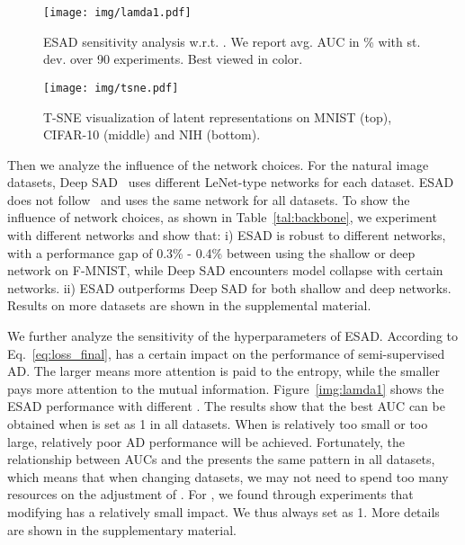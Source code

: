 \documentclass{bmvc2k}
\begin{document}
\begin{figure}[t]
\centering
\begin{minipage}[t]{0.47\textwidth}
\centering
\texttt{[image: img/lamda1.pdf]}
\vspace{-8pt}
\caption{\label{img:lamda1}ESAD sensitivity analysis w.r.t. . We report avg. AUC in \% with st. dev. over 90 experiments. Best viewed in color.}
\end{minipage}
\begin{minipage}[t]{0.2\textwidth}
\end{minipage}
\begin{minipage}[t]{0.47\textwidth}
\centering
\texttt{[image: img/tsne.pdf]}
\vspace{-5pt}
\caption{\label{img:tsne}T-SNE visualization of latent representations on MNIST (top), CIFAR-10 (middle) and NIH (bottom).}
\end{minipage}
\vspace{-5pt}
\end{figure}

Then we analyze the influence of the network choices. For the natural image datasets, Deep SAD~\cite{SAD} uses different LeNet-type networks for each dataset. ESAD does not follow~\cite{SAD} and uses the same network for all datasets. To show the influence of network choices, as shown in Table~\ref{tal:backbone}, we experiment with different networks and show that: i) ESAD is robust to different networks, with a performance gap of 0.3\% - 0.4\% between using the shallow or deep network on F-MNIST, while Deep SAD encounters model collapse with certain networks.  ii) ESAD outperforms Deep SAD for both shallow and deep networks. Results on more datasets are shown in the supplemental material.

We further analyze the sensitivity of the hyperparameters of ESAD. According to Eq.~\eqref{eq:loss_final},  has a certain impact on the performance of semi-supervised AD. The larger  means more attention is paid to the entropy, while the smaller  pays more attention to the mutual information. Figure~\ref{img:lamda1} shows the ESAD performance with different . The results show that the best AUC can be obtained when  is set as 1 in all datasets. When  is relatively too small or too large, relatively poor AD performance will be achieved. Fortunately, the relationship between AUCs and the  presents the same pattern in all datasets, which means that when changing datasets, we may not need to spend too many resources on the adjustment of . For , we found through experiments that modifying  has a relatively small impact. We thus always set  as 1. More details are shown in the supplementary material.
\end{document}
